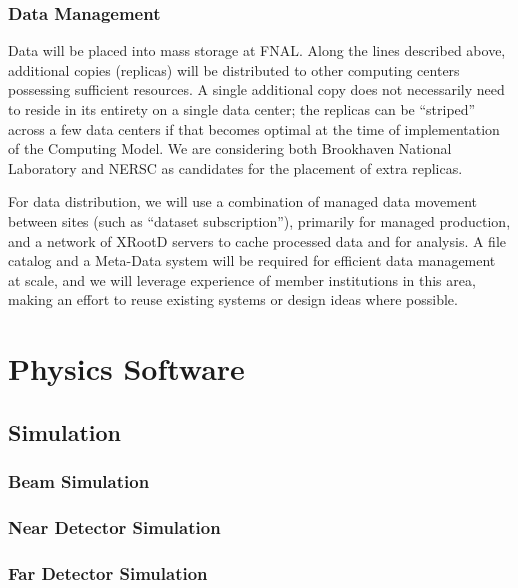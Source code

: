 \subsubsection{Data Management}
\label{sec:detectors-sc-infrastructure-computing-model-data-mgt}

Data will be placed into mass storage at FNAL. Along the lines described above, additional copies (replicas) will be distributed to other
computing centers possessing sufficient resources.
A single additional copy does not necessarily need to reside in its entirety on a single data center; the replicas can be ``striped'' across a few data centers if that becomes optimal
at the time of implementation of the Computing Model. We are considering both Brookhaven National Laboratory and NERSC as candidates for the placement of extra replicas.

For data distribution, we will use a combination of managed data movement between sites (such as ``dataset subscription''), primarily for managed production, and a network of XRootD
servers to cache processed data and for analysis. A file catalog and a Meta-Data system will be required for efficient data management at scale, and we will leverage experience of
member institutions in this area, making an effort to reuse existing systems or design ideas where possible.


\section{Physics Software}
\label{sec:detectors-sc-physics-software}

\subsection{Simulation}
\label{sec:detectors-sc-physics-software-simulation}

\subsubsection{Beam Simulation}
\label{sec:detectors-sc-physics-software-simulation-beam}

\subsubsection{Near Detector Simulation}
\label{sec:detectors-sc-physics-software-simulation-nd}

\subsubsection{Far Detector Simulation}
\label{sec:detectors-sc-physics-software-simulation-fd}


